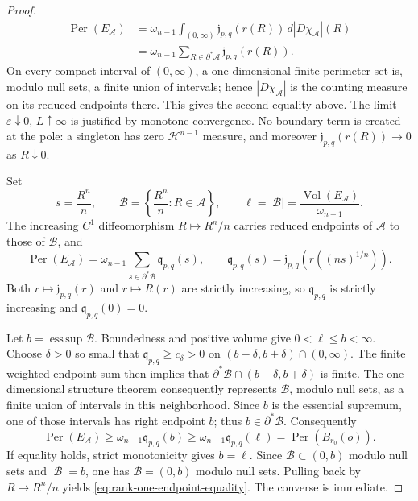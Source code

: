 \documentclass[11pt,reqno]{amsart}
\numberwithin{equation}{section}
\theoremstyle{definition}
\theoremstyle{remark}
\newcommand{\Vol}{\operatorname{Vol}}
\newcommand{\Per}{\operatorname{Per}}
\begin{document}
\begin{proof}
\[
\begin{aligned}
 \Per(E_{\mathscr A})
 & =\omega_{n-1}\int_{(0,\infty)}
 \mathfrak j_{p,q}(r(R))\,d|D\chi_{\mathscr A}|(R)\\
 & =\omega_{n-1}\sum_{R\in\partial^*\mathscr A}
 \mathfrak j_{p,q}(r(R)).
\end{aligned}
\]
On every compact interval of $(0,\infty)$, a one-dimensional
finite-perimeter set is, modulo null sets, a finite union of intervals; hence
$|D\chi_{\mathscr A}|$ is the counting measure on its reduced endpoints there.
This gives the second equality above.  The limit
$\varepsilon\downarrow0$, $L\uparrow\infty$ is justified by monotone
convergence.  No boundary term is created at the pole: a singleton has zero
$\mathcal H^{n-1}$ measure, and moreover
$\mathfrak j_{p,q}(r(R))\to0$ as $R\downarrow0$.

Set
\[
 s=\frac{R^n}{n},\qquad
 \mathscr B=\left\{\frac{R^n}{n}:R\in\mathscr A\right\},\qquad
 \ell=|\mathscr B|=\frac{\Vol(E_{\mathscr A})}{\omega_{n-1}}.
\]
The increasing $C^1$ diffeomorphism $R\mapsto R^n/n$ carries reduced
endpoints of $\mathscr A$ to those of $\mathscr B$, and
\[
 \Per(E_{\mathscr A})
 =\omega_{n-1}\sum_{s\in\partial^*\mathscr B}\mathfrak q_{p,q}(s),
 \qquad
 \mathfrak q_{p,q}(s)
 =\mathfrak j_{p,q}\left(r((ns)^{1/n})\right).
\]
Both $r\mapsto\mathfrak j_{p,q}(r)$ and $r\mapsto R(r)$ are strictly
increasing, so $\mathfrak q_{p,q}$ is strictly increasing and
$\mathfrak q_{p,q}(0)=0$.

Let $b=\operatorname*{ess\,sup}\mathscr B$.  Boundedness and positive volume
give $0<\ell\le b<\infty$.  Choose $\delta>0$ so small that
$\mathfrak q_{p,q}\ge c_\delta>0$ on $(b-\delta,b+\delta)\cap(0,\infty)$.
The finite weighted endpoint sum then implies that
$\partial^*\mathscr B\cap(b-\delta,b+\delta)$ is finite.  The
one-dimensional structure theorem consequently represents $\mathscr B$, modulo
null sets, as a finite union of intervals in this neighborhood.  Since $b$ is
the essential supremum, one of those intervals has right endpoint $b$; thus
$b\in\partial^*\mathscr B$.  Consequently
\[
 \Per(E_{\mathscr A})
 \ge\omega_{n-1}\mathfrak q_{p,q}(b)
 \ge\omega_{n-1}\mathfrak q_{p,q}(\ell)
 =\Per(B_{r_0}(o)).
\]
If equality holds, strict monotonicity gives $b=\ell$.  Since
$\mathscr B\subset(0,b)$ modulo null sets and $|\mathscr B|=b$, one has
$\mathscr B=(0,b)$ modulo null sets.  Pulling back by $R\mapsto R^n/n$ yields
\eqref{eq:rank-one-endpoint-equality}.  The converse is immediate.
\end{proof}
\end{document}

